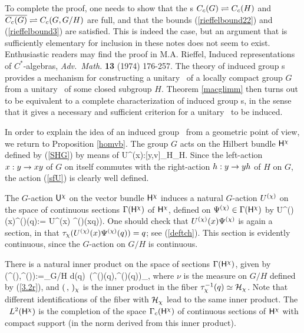 To complete the proof, one needs to show that the \HCM s $C_c(G)\rightleftharpoons C_c(H)$  and
$\overline{C_c(G)}\rightleftharpoons C_c(G,G/H)$ are full, and that the bounds (\ref{rieffelbound22})
and (\ref{rieffelbound3}) are satisfied. This is indeed the case, but an argument that is
sufficiently elementary for inclusion in these notes does not seem to exist.
Enthusiastic readers may find the proof in M.A. Rieffel, Induced representations of
$C^*$-algebras, {\em Adv.\ Math.} {\bf 13} (1974) 176-257.
\enp
{}
The theory of induced group \rep s provides a mechanism for constructing a unitary \rep\ of a
locally compact group
$G$ from a unitary \rep\ of some closed subgroup $H$. Theorem \ref{macglimm}  then turns out to be
equivalent to a complete characterization of induced group \rep s, in the sense that it gives a
necessary and sufficient criterion for a unitary \rep\ to be induced.

In order to explain the idea of an induced group \rep\ from a geometric point of view, we return
to Proposition \ref{homvb}. The group $G$ acts on the Hilbert bundle ${\sf H}^{\chi}$ defined by
(\ref{SHG}) by means of
\be
{\sf U}^{\ch}(x):[y,v]_H\raw [xy,v]_H. 
\ee
Since the left-action $x:y\rightarrow xy$ of $G$ on itself commutes with the right-action
$h:y\rightarrow yh$ of $H$ on $G$, the action (\ref{sfU}) is clearly well defined.

The $G$-action ${\sf U}^{\chi}$ on the vector bundle ${\sf H}^{\chi}$ induces a
natural $G$-action $U^{(\chi)}$ on the space of continuous sections
$\Gamma({\sf H}^{\chi})$ of ${\sf H}^{\chi}$, defined on $\Psi^{(\chi)}\in\Gamma({\sf H}^{\chi})$ by \be
U^{(\ch)}(x)\Ps^{(\ch)}(q):= {\sf U}^{\ch}(x) \Ps^{(\ch)}(x\inv q)).
 \ee One should check that $U^{(\chi)}(x)\Psi^{(\chi)}$ is
again a section, in that $\tau_{\chi}(U^{(\chi)}(x)\Psi^{(\chi)}(q))=q$;
see (\ref{deftch}).  This section is evidently continuous, since the
$G$-action on $G/H$ is continuous.

 There is a natural inner product on the space of sections
$\Gamma({\sf H}^{\chi})$, given by \be (\Ps^{(\ch)},\Ph^{(\ch)}):=\int_{G/H} d\nu(q)\,
(\Ps^{(\ch)}(q),\Ph^{(\ch)}(q))_{\ch},  \ee where $\nu$ is
the measure on $G/H$ defined by (\ref{3.2r}), and $(\, ,\, )_{\chi}$ is
the inner product in the fiber $\tau_{\chi}^{-1} (q)\simeq{\cal H}_{\chi}$. Note
that different identifications of the fiber with ${\cal H}_{\chi}$ lead to the
same inner product.  The \Hs\ $L^2({\sf H}^{\chi})$ is the completion of the
space $\Gamma_c({\sf H}^{\chi})$ of continuous sections of ${\sf H}^{\chi}$ with compact
support (in the norm derived from this inner product).

